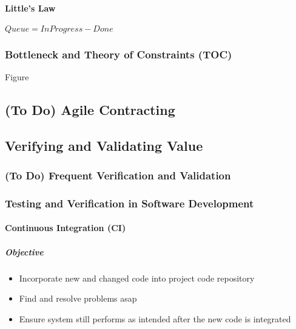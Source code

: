 \documentclass[letterpaper,10pt,english]{jupyterBook}
\begin{document}
\paragraph{Little’s Law}
\label{\detokenize{APM/agile:little-s-law}}
\sphinxAtStartPar
\(Queue = In Progress - Done\)


\subsubsection{Bottleneck and Theory of Constraints (TOC)}
\label{\detokenize{APM/agile:bottleneck-and-theory-of-constraints-toc}}
\sphinxAtStartPar
Figure


\subsection{(To Do) Agile Contracting}
\label{\detokenize{APM/agile:to-do-agile-contracting}}

\subsection{Verifying and Validating Value}
\label{\detokenize{APM/agile:verifying-and-validating-value}}

\subsubsection{(To Do) Frequent Verification and Validation}
\label{\detokenize{APM/agile:to-do-frequent-verification-and-validation}}

\subsubsection{Testing and Verification in Software Development}
\label{\detokenize{APM/agile:testing-and-verification-in-software-development}}

\paragraph{Continuous Integration (CI)}
\label{\detokenize{APM/agile:continuous-integration-ci}}

\subparagraph{Objective}
\label{\detokenize{APM/agile:objective}}\begin{itemize}
\item {} 
\sphinxAtStartPar
Incorporate new and changed code into project code repository

\item {} 
\sphinxAtStartPar
Find and resolve problems asap

\item {} 
\sphinxAtStartPar
Ensure system still performs as intended after the new code is integrated

\end{itemize}
\end{document}

